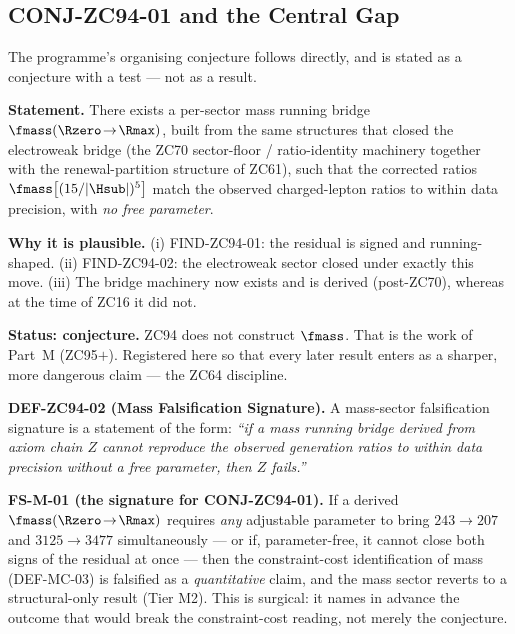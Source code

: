 \documentclass[12pt, a4paper]{article}
\begin{document}
\subsection{CONJ-ZC94-01 and the Central Gap}
\label{sec:conj-gap-zc94}

The programme's organising conjecture follows directly, and is stated as a
conjecture with a test --- not as a result.

\begin{openqbox}[title={CONJ-ZC94-01: The Mass Running Bridge Closes GAP-MC-01}]
\textbf{Statement.} There exists a per-sector mass running bridge
$\fmass(\Rzero\!\to\!\Rmax)$, built from the same structures that closed the
electroweak bridge (the ZC70 sector-floor / ratio-identity machinery together
with the renewal-partition structure of ZC61), such that the corrected ratios
$\fmass\big[(15/|\Hsub|)^5\big]$ match the observed charged-lepton ratios to
within data precision, with \emph{no free parameter}.

\textbf{Why it is plausible.} (i) FIND-ZC94-01: the residual is signed and
running-shaped. (ii) FIND-ZC94-02: the electroweak sector closed under exactly
this move. (iii) The bridge machinery now exists and is derived (post-ZC70),
whereas at the time of ZC16 it did not.

\textbf{Status: conjecture.} ZC94 does not construct $\fmass$. That is the work
of Part~M (ZC95$+$). Registered here so that every later result enters as a
sharper, more dangerous claim --- the ZC64 discipline.
\end{openqbox}

\begin{fsbox}[title={DEF-ZC94-02 / FS-M-01: Mass-Sector Falsification
  Signature}]
\textbf{DEF-ZC94-02 (Mass Falsification Signature).} A mass-sector falsification
signature is a statement of the form: \emph{``if a mass running bridge derived
from axiom chain $Z$ cannot reproduce the observed generation ratios to within
data precision without a free parameter, then $Z$ fails.''}

\smallskip
\textbf{FS-M-01 (the signature for CONJ-ZC94-01).} If a derived
$\fmass(\Rzero\!\to\!\Rmax)$ requires \emph{any} adjustable parameter to bring
$243\to207$ and $3125\to3477$ simultaneously --- or if, parameter-free, it
cannot close both signs of the residual at once --- then the constraint-cost
identification of mass (DEF-MC-03) is falsified as a \emph{quantitative} claim,
and the mass sector reverts to a structural-only result (Tier M2). This is
surgical: it names in advance the outcome that would break the constraint-cost
reading, not merely the conjecture.
\end{fsbox}
\end{document}
